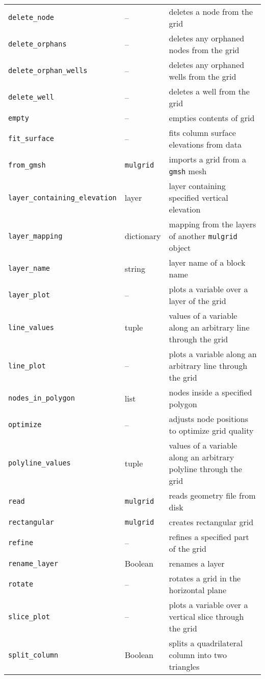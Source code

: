 \begin{center}
\begin{longtable}{|l|l|p{70mm}|}
  \texttt{delete\_node} & -- & deletes a node from the grid\\ 
  \texttt{delete\_orphans} & -- & deletes any orphaned nodes from the grid\\ 
  \texttt{delete\_orphan\_wells} & -- & deletes any orphaned wells from the grid\\ 
  \texttt{delete\_well} & -- & deletes a well from the grid\\ 
  \texttt{empty} & --  & empties contents of grid\\
  \texttt{fit\_surface} & -- & fits column surface elevations from data\\ 
  \texttt{from\_gmsh} & \texttt{mulgrid} & imports a grid from a \texttt{gmsh} mesh\\ 
  \texttt{layer\_containing\_elevation} & layer & layer containing specified vertical elevation\\
  \texttt{layer\_mapping} & dictionary & mapping from the layers of another \texttt{mulgrid} object\\
  \texttt{layer\_name} & string & layer name of a block name\\ 
  \texttt{layer\_plot} & -- & plots a variable over a layer of the grid\\
  \texttt{line\_values} & tuple & values of a variable along an arbitrary line through the grid\\
  \texttt{line\_plot} & -- & plots a variable along an arbitrary line through the grid\\
  \texttt{nodes\_in\_polygon} & list & nodes inside a specified polygon\\ 
  \texttt{optimize} & -- & adjusts node positions to optimize grid quality\\
  \texttt{polyline\_values} & tuple & values of a variable along an arbitrary polyline through the grid\\
  \texttt{read} & \texttt{mulgrid} & reads geometry file from disk\\
  \texttt{rectangular} & \texttt{mulgrid} & creates rectangular grid\\
  \texttt{refine} & -- & refines a specified part of the grid\\
  \texttt{rename\_layer} & Boolean & renames a layer\\
  \texttt{rotate} & -- & rotates a grid in the horizontal plane\\
  \texttt{slice\_plot} & -- & plots a variable over a vertical slice through the grid\\
  \texttt{split\_column} & Boolean & splits a quadrilateral column into two triangles\\ 

\end{longtable}
\end{center}
